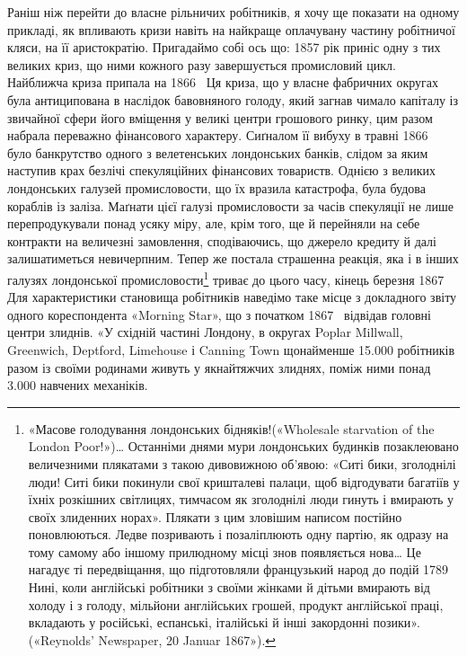 Раніш ніж перейти до власне рільничих робітників, я хочу
ще показати на одному прикладі, як впливають кризи навіть на
найкраще оплачувану частину робітничої кляси, на її аристократію.
Пригадаймо собі ось що: 1857 рік приніс одну з тих
великих криз, що ними кожного разу завершується промисловий
цикл. Найближча криза припала на 1866~ Ця криза, що у власне
фабричних округах була антиципована в наслідок бавовняного
голоду, який загнав чимало капіталу із звичайної сфери його
вміщення у великі центри грошового ринку, цим разом набрала
переважно фінансового характеру. Сиґналом її вибуху в травні
1866~ було банкрутство одного з велетенських лондонських
банків, слідом за яким наступив крах безлічі спекуляційних
фінансових товариств. Однією з великих лондонських галузей
промисловости, що їх вразила катастрофа, була будова кораблів
із заліза. Маґнати цієї галузі промисловости за часів спекуляції
не лише перепродукували понад усяку міру, але, крім
того, ще й перейняли на себе контракти на величезні замовлення,
сподіваючись, що джерело кредиту й далі залишатиметься невичерпним.
Тепер же постала страшенна реакція, яка і в інших
галузях лондонської промисловости\footnote{
«Масове голодування лондонських бідняків!(«Wholesale starvation
of the London Poor!»)\dots{} Останніми днями мури лондонських будинків
позаклеювано величезними плякатами з такою дивовижною об’явою:
«Ситі бики, зголоднілі люди! Ситі бики покинули свої кришталеві
палаци, щоб відгодувати багатіїв у їхніх розкішних світлицях, тимчасом
як зголоднілі люди гинуть і вмирають у своїх злиденних норах». Плякати
з цим зловішим написом постійно поновлюються. Ледве позривають і
позаліплюють одну партію, як одразу на тому самому або іншому прилюдному
місці знов появляється нова\dots{} Це нагадує ті передвіщання, що підготовляли
французький народ до подій 1789~ Нині, коли англійські
робітники з своїми жінками й дітьми вмирають від холоду і з голоду,
мільйони англійських грошей, продукт англійської праці, вкладають
у російські, еспанські, італійські й інші закордонні позики». («Reynolds'
Newspaper, 20 Januar 1867»).
} триває до цього часу,
кінець березня 1867~ Для характеристики становища робітників
наведімо таке місце з докладного звіту одного кореспондента
«Morning Star», що з початком 1867~ відвідав головні
центри злиднів. «У східній частині Лондону, в округах Poplar
Millwall, Greenwich, Deptford, Limehouse і Canning Town щонайменше
\num{15.000} робітників разом із своїми родинами живуть у
якнайтяжчих злиднях, поміж ними понад \num{3.000} навчених механіків.
